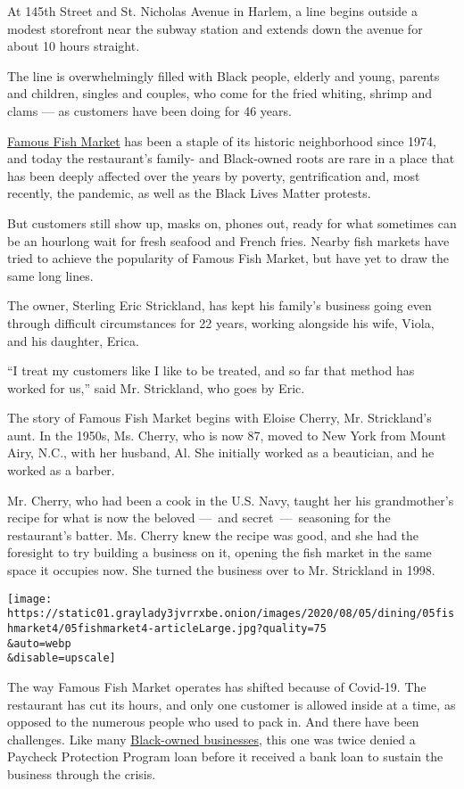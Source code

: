 At 145th Street and St. Nicholas Avenue in Harlem, a line begins outside
a modest storefront near the subway station and extends down the avenue
for about 10 hours straight.

The line is overwhelmingly filled with Black people, elderly and young,
parents and children, singles and couples, who come for the fried
whiting, shrimp and clams --- as customers have been doing for 46 years.

\href{http://www.famousfishmarket.us/}{Famous Fish Market} has been a
staple of its historic neighborhood since 1974, and today the
restaurant's family- and Black-owned roots are rare in a place that has
been deeply affected over the years by poverty, gentrification and, most
recently, the pandemic, as well as the Black Lives Matter protests.

But customers still show up, masks on, phones out, ready for what
sometimes can be an hourlong wait for fresh seafood and French fries.
Nearby fish markets have tried to achieve the popularity of Famous Fish
Market, but have yet to draw the same long lines.

The owner, Sterling Eric Strickland, has kept his family's business
going even through difficult circumstances for 22 years, working
alongside his wife, Viola, and his daughter, Erica.

``I treat my customers like I like to be treated, and so far that method
has worked for us,'' said Mr. Strickland, who goes by Eric.

The story of Famous Fish Market begins with Eloise Cherry, Mr.
Strickland's aunt. In the 1950s, Ms. Cherry, who is now 87, moved to New
York from Mount Airy, N.C., with her husband, Al. She initially worked
as a beautician, and he worked as a barber.

Mr. Cherry, who had been a cook in the U.S. Navy, taught her his
grandmother's recipe for what is now the beloved ---~and
secret~---~seasoning for the restaurant's batter. Ms. Cherry knew the
recipe was good, and she had the foresight to try building a business on
it, opening the fish market in the same space it occupies now. She
turned the business over to Mr. Strickland in 1998.

\texttt{[image: https://static01.graylady3jvrrxbe.onion/images/2020/08/05/dining/05fishmarket4/05fishmarket4-articleLarge.jpg?quality=75\\\&auto=webp\\\&disable=upscale]}

The way Famous Fish Market operates has shifted because of Covid-19. The
restaurant has cut its hours, and only one customer is allowed inside at
a time, as opposed to the numerous people who used to pack in. And there
have been challenges. Like many
\href{https://www.nytimes3xbfgragh.onion/2020/05/18/business/minority-businesses-coronavirus-loans.html}{Black-owned
businesses}, this one was twice denied a Paycheck Protection Program
loan before it received a bank loan to sustain the business through the
crisis.

